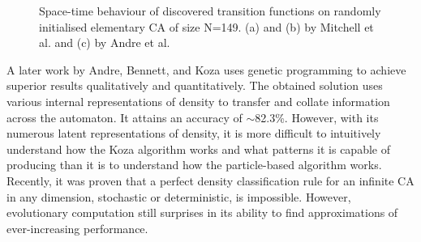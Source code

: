 \begin{figure}[!h]
\centering
            \hfill
            \hfill
            \hfill
            \caption{Space-time behaviour of discovered transition functions on randomly initialised elementary CA of size N=149. (a) and (b) by Mitchell et al.\cite{mitchell1996evolving} and (c) by Andre et al.\cite{andre1996discovery}}
\label{fig:1d-transitions}
\end{figure}

A later work by Andre, Bennett, and Koza\cite{andre1996discovery} uses genetic programming to achieve superior results qualitatively and quantitatively. The obtained solution uses various internal representations of density to transfer and collate information across the automaton. It attains an accuracy of $\sim$82.3\%. However, with its numerous latent representations of density, it is more difficult to intuitively understand how the Koza algorithm works and what patterns it is capable of producing than it is to understand how the particle-based algorithm works. Recently, it was proven that a perfect density classification rule for an infinite CA in any dimension, stochastic or deterministic, is impossible\cite{buvsic2012density}. However, evolutionary computation still surprises in its ability to find approximations of ever-increasing performance. 

